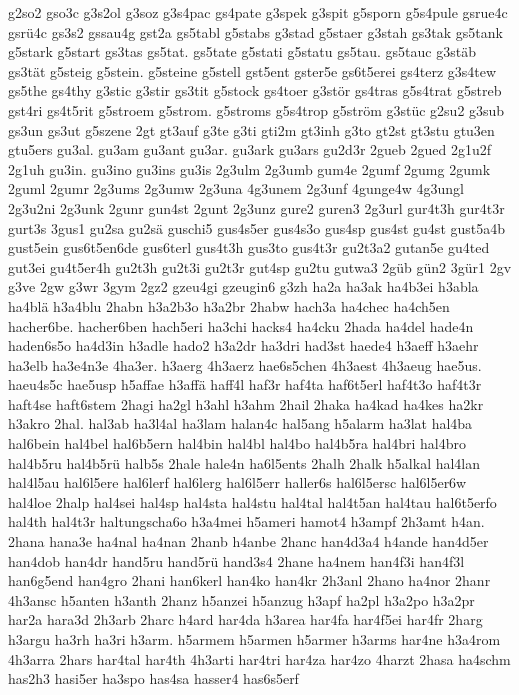 {g2so2
gso3c
g3s2ol
g3soz
g3s4pac
gs4pate
g3spek
g3spit
g5sporn
g5s4pule
gsrue4c
gsrü4c
gs3s2
gssau4g
gst2a
gs5tabl
g5stabs
g3stad
g5staer
g3stah
gs3tak
gs5tank
g5stark
g5start
gs3tas
gs5tat.
gs5tate
g5stati
g5statu
gs5tau.
gs5tauc
g3stäb
gs3tät
g5steig
g5stein.
g5steine
g5stell
gst5ent
gster5e
gs6t5erei
gs4terz
g3s4tew
gs5the
gs4thy
g3stic
g3stir
gs3tit
g5stock
gs4toer
g3stör
gs4tras
g5s4trat
g5streb
gst4ri
gs4t5rit
g5stroem
g5strom.
g5stroms
g5s4trop
g5ström
g3stüc
g2su2
g3sub
gs3un
gs3ut
g5szene
2gt
gt3auf
g3te
g3ti
gti2m
gt3inh
g3to
gt2st
gt3stu
gtu3en
gtu5ers
gu3al.
gu3am
gu3ant
gu3ar.
gu3ark
gu3ars
gu2d3r
2gueb
2gued
2g1u2f
2g1uh
gu3in.
gu3ino
gu3ins
gu3is
2g3ulm
2g3umb
gum4e
2gumf
2gumg
2gumk
2guml
2gumr
2g3ums
2g3umw
2g3una
4g3unem
2g3unf
4gunge4w
4g3ungl
2g3u2ni
2g3unk
2gunr
gun4st
2gunt
2g3unz
gure2
guren3
2g3url
gur4t3h
gur4t3r
gurt3s
3gus1
gu2sa
gu2sä
guschi5
gus4s5er
gus4s3o
gus4sp
gus4st
gu4st
gust5a4b
gust5ein
gus6t5en6de
gus6terl
gus4t3h
gus3to
gus4t3r
gu2t3a2
gutan5e
gu4ted
gut3ei
gu4t5er4h
gu2t3h
gu2t3i
gu2t3r
gut4sp
gu2tu
gutwa3
2güb
gün2
3gür1
2gv
g3ve
2gw
g3wr
3gym
2gz2
gzeu4gi
gzeugin6
g3zh
ha2a
ha3ak
ha4b3ei
h3abla
ha4blä
h3a4blu
2habn
h3a2b3o
h3a2br
2habw
hach3a
ha4chec
ha4ch5en
hacher6be.
hacher6ben
hach5eri
ha3chi
hacks4
ha4cku
2hada
ha4del
hade4n
haden6s5o
ha4d3in
h3adle
hado2
h3a2dr
ha3dri
had3st
haede4
h3aeff
h3aehr
ha3elb
ha3e4n3e
4ha3er.
h3aerg
4h3aerz
hae6s5chen
4h3aest
4h3aeug
hae5us.
haeu4s5c
hae5usp
h5affae
h3affä
haff4l
haf3r
haf4ta
haf6t5erl
haf4t3o
haf4t3r
haft4se
haft6stem
2hagi
ha2gl
h3ahl
h3ahm
2hail
2haka
ha4kad
ha4kes
ha2kr
h3akro
2hal.
hal3ab
ha3l4al
ha3lam
halan4c
hal5ang
h5alarm
ha3lat
hal4ba
hal6bein
hal4bel
hal6b5ern
hal4bin
hal4bl
hal4bo
hal4b5ra
hal4bri
hal4bro
hal4b5ru
hal4b5rü
halb5s
2hale
hale4n
ha6l5ents
2halh
2halk
h5alkal
hal4lan
hal4l5au
hal6l5ere
hal6lerf
hal6lerg
hal6l5err
haller6s
hal6l5ersc
hal6l5er6w
hal4loe
2halp
hal4sei
hal4sp
hal4sta
hal4stu
hal4tal
hal4t5an
hal4tau
hal6t5erfo
hal4th
hal4t3r
haltungscha6o
h3a4mei
h5ameri
hamot4
h3ampf
2h3amt
h4an.
2hana
hana3e
ha4nal
ha4nan
2hanb
h4anbe
2hanc
han4d3a4
h4ande
han4d5er
han4dob
han4dr
hand5ru
hand5rü
hand3s4
2hane
ha4nem
han4f3i
han4f3l
han6g5end
han4gro
2hani
han6kerl
han4ko
han4kr
2h3anl
2hano
ha4nor
2hanr
4h3ansc
h5anten
h3anth
2hanz
h5anzei
h5anzug
h3apf
ha2pl
h3a2po
h3a2pr
har2a
hara3d
2h3arb
2harc
h4ard
har4da
h3area
har4fa
har4f5ei
har4fr
2harg
h3argu
ha3rh
ha3ri
h3arm.
h5armem
h5armen
h5armer
h3arms
har4ne
h3a4rom
4h3arra
2hars
har4tal
har4th
4h3arti
har4tri
har4za
har4zo
4harzt
2hasa
ha4schm
has2h3
hasi5er
ha3spo
has4sa
hasser4
has6s5erf
}

